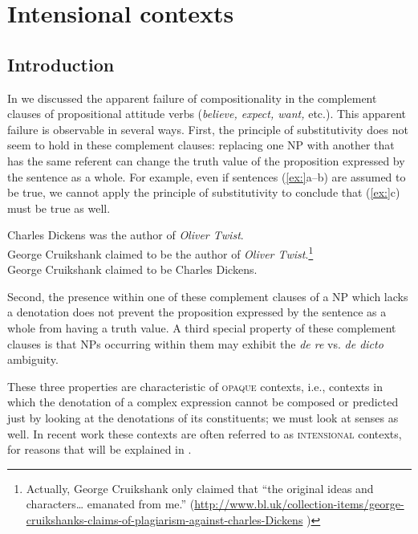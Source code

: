 \chapter{Intensional contexts}\label{sec:15}

\section{Introduction}\label{sec:15.1}

In  we discussed the apparent failure of compositionality in the complement clauses of propositional attitude verbs (\textit{believe, expect, want,} etc.). This apparent failure is observable in several ways. First, the principle of substitutivity does not seem to hold in these complement clauses: replacing one NP with another that has the same referent can change the truth value of the proposition expressed by the sentence as a whole. For example, even if sentences (\ref{ex:}a--b) are assumed to be true, we cannot apply the principle of substitutivity to conclude that (\ref{ex:}c) must be true as well.


\ea
\ea Charles Dickens was the author of \textit{Oliver Twist}.\\
\ex George Cruikshank claimed to be the author of \textit{Oliver Twist}.\footnote{Actually, George Cruikshank only claimed that “the original ideas and characters… emanated from me.” (\url{http://www.bl.uk/collection-items/george-cruikshanks-claims-of-plagiarism-against-charles-Dickens} )}\\
\ex George Cruikshank claimed to be Charles Dickens.
                       \z
\z


Second, the presence within one of these complement clauses of a NP which lacks a denotation does not prevent the proposition expressed by the sentence as a whole from having a truth value. A third special property of these complement clauses is that NPs occurring within them may exhibit the \textit{de re} vs. \textit{de dicto} ambiguity.



These three properties are characteristic of \textsc{opaque} contexts, i.e., contexts in which the denotation of a complex expression cannot be composed or predicted just by looking at the denotations of its constituents; we must look at senses as well. In recent work these contexts are often referred to as \textsc{intensional} contexts, for reasons that will be explained in .




